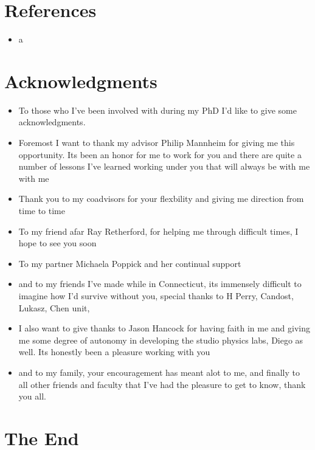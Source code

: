 \documentclass[10pt,letterpaper]{article}
\numberwithin{equation}{section}
\begin{document}

\section{References}
\begin{itemize}
	\item a
\end{itemize}


\section{Acknowledgments}
\begin{itemize}
	\item To those who I've been involved with during my PhD I'd like to give some acknowledgments.
	\item Foremost I want to thank my advisor Philip Mannheim for giving me this opportunity. Its been an honor for me to work for you and there are quite a number of lessons I've learned working under you that will always be with me with me
	\item Thank you to my coadvisors for your flexbility and giving me direction from time to time
	\item To my friend afar Ray Retherford, for helping me through difficult times, I hope to see you soon
	\item To my partner Michaela Poppick and her continual support
	\item and to my friends I've made while in Connecticut, its immensely difficult to imagine how I'd survive without you, special thanks to H Perry, Candost, Lukasz, Chen unit,
	\item I also want to give thanks to Jason Hancock for having faith in me and giving me some degree of autonomy in developing the studio physics labs, Diego as well. Its honestly been a pleasure working with you
	\item and to my family, your encouragement has meant alot to me, and finally to all other friends and faculty that I've had the pleasure to get to know, thank you all. 
\end{itemize}


\section{The End}

\end{document}
